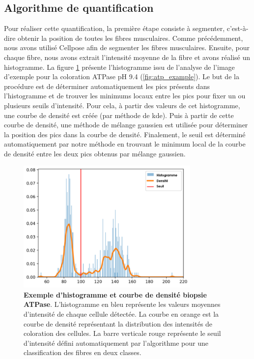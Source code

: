 \subsection{Algorithme de quantification}
Pour réaliser cette quantification, la première étape consiste à segmenter, c'est-à-dire obtenir la position de toutes les fibres musculaires. Comme précédemment, nous avons utilisé Cellpose afin de segmenter les fibres musculaires. Ensuite, pour chaque fibre, nous avons extrait l'intensité moyenne de la fibre et avons réalisé un histogramme. La figure \ref{fig:atp_density} présente l'histogramme issu de l'analyse de l'image d'exemple pour la coloration ATPase pH 9.4 (\ref{fig:atp_example}). Le but de la procédure est de déterminer automatiquement les pics présents dans l'histogramme et de trouver les minimums locaux entre les pics pour fixer un ou plusieurs seuils d'intensité. Pour cela, à partir des valeurs de cet histogramme, une courbe de densité est créée (par méthode de \gls{kde}). Puis à partir de cette courbe de densité, une méthode de mélange gaussien est utilisée pour déterminer la position des pics dans la courbe de densité. Finalement, le seuil est déterminé automatiquement par notre méthode en trouvant le minimum local de la courbe de densité entre les deux pics obtenus par mélange gaussien.
\begin{figure}[!ht]
 \centering
 \includegraphics[width=0.8\textwidth]{figures/density_plot.png}
 \caption[Exemple d'histogramme et courbe de densité biopsie ATPase]{\textbf{Exemple d'histogramme et courbe de densité biopsie ATPase}. L'histogramme en bleu représente les valeurs moyennes d'intensité de chaque cellule détectée. La courbe en orange est la courbe de densité représentant la distribution des intensités de coloration des cellules. La barre verticale rouge représente le seuil d'intensité défini automatiquement par l'algorithme pour une classification des fibres en deux classes.}
 \label{fig:atp_density}
\end{figure}

